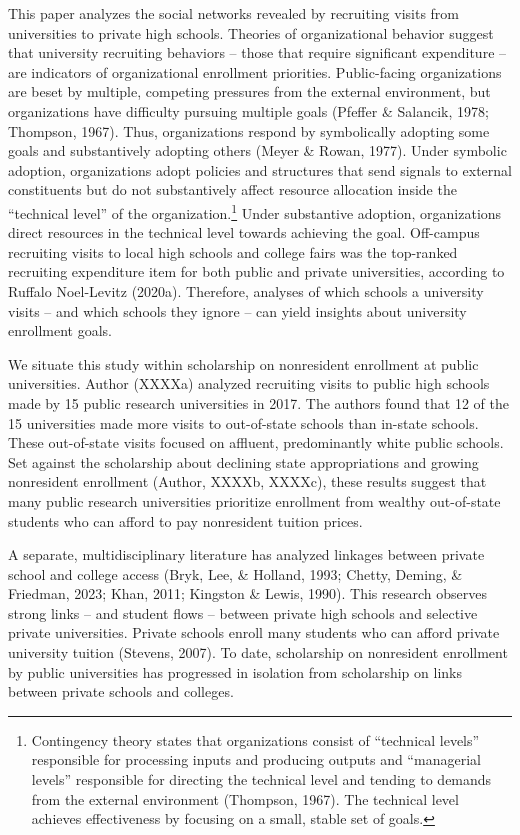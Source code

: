 \documentclass[
  12pt,
]{article}
\begin{document}
This paper analyzes the social networks revealed by recruiting visits from universities to private high schools. Theories of organizational behavior suggest that university recruiting behaviors -- those that require significant expenditure -- are indicators of organizational enrollment priorities. Public-facing organizations are beset by multiple, competing pressures from the external environment, but organizations have difficulty pursuing multiple goals (Pfeffer \& Salancik, 1978; Thompson, 1967). Thus, organizations respond by symbolically adopting some goals and substantively adopting others (Meyer \& Rowan, 1977). Under symbolic adoption, organizations adopt policies and structures that send signals to external constituents but do not substantively affect resource allocation inside the ``technical level'' of the organization.\footnote{Contingency theory states that organizations consist of ``technical levels'' responsible for processing inputs and producing outputs and ``managerial levels'' responsible for directing the technical level and tending to demands from the external environment (Thompson, 1967). The technical level achieves effectiveness by focusing on a small, stable set of goals.} Under substantive adoption, organizations direct resources in the technical level towards achieving the goal. Off-campus recruiting visits to local high schools and college fairs was the top-ranked recruiting expenditure item for both public and private universities, according to Ruffalo Noel-Levitz (2020a). Therefore, analyses of which schools a university visits -- and which schools they ignore -- can yield insights about university enrollment goals.

We situate this study within scholarship on nonresident enrollment at public universities. Author (XXXXa) analyzed recruiting visits to public high schools made by 15 public research universities in 2017. The authors found that 12 of the 15 universities made more visits to out-of-state schools than in-state schools. These out-of-state visits focused on affluent, predominantly white public schools. Set against the scholarship about declining state appropriations and growing nonresident enrollment (Author, XXXXb, XXXXc), these results suggest that many public research universities prioritize enrollment from wealthy out-of-state students who can afford to pay nonresident tuition prices.

A separate, multidisciplinary literature has analyzed linkages between private school and college access (Bryk, Lee, \& Holland, 1993; Chetty, Deming, \& Friedman, 2023; Khan, 2011; Kingston \& Lewis, 1990). This research observes strong links -- and student flows -- between private high schools and selective private universities. Private schools enroll many students who can afford private university tuition (Stevens, 2007). To date, scholarship on nonresident enrollment by public universities has progressed in isolation from scholarship on links between private schools and colleges.
\end{document}
